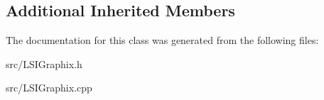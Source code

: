 \subsection*{Additional Inherited Members}


The documentation for this class was generated from the following files\+:\begin{DoxyCompactItemize}
\item 
src/L\+S\+I\+Graphix.\+h\item 
src/L\+S\+I\+Graphix.\+cpp\end{DoxyCompactItemize}
